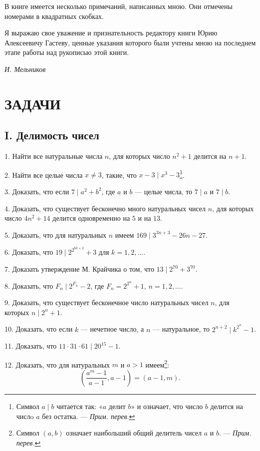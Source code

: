 \documentclass[12pt, a4paper, openany]{book}
\begin{document}
В книге имеется несколько примечаний, написанных мною. Они отмечены номерами в квадратных скобках.

Я выражаю свое уважение и признательность редактору книги Юрию Алексеевичу Гастеву, ценные указания которого были учтены мною на последнем этапе работы над рукописью этой книги.

	\begin{flushright}
	\textit{И. Мельников}
\end{flushright}
\newpage

	\section[Задачи]{\center ЗАДАЧИ}
	\subsection[I. Делимость чисел (1-43)]{\center I. Делимость чисел}

 
1. Найти все натуральные числа $n$, для которых число $n^2+1$ делится на $n+1$.

2. Найти все целые числа $x \neq 3$, такие, что $x - 3 \mid x^3 - 3${\footnote{Символ $a \mid b$ читается так: «$a$ делит $b$» и означает, что число $b$ делится на числo $a$ без остатка. — \textit{Прим. перев}.}}.

3. Доказать, что если $7 \mid a^2 + b^2$, где $a$ и $b$ — целые числа, то $7 \mid a$ и $7 \mid b$.

4. Доказать, что существует бесконечно много натуральных чисел $n$, для которых число $4n^2+14$ делится одновременно на $5$ и на $13$.

5.  Доказать, что для натуральных $n$ имеем $169 \mid 3^{3n+3} - 26n - 27$.

6. Доказать, что $19 \mid 2^{2^{6k+2}} + 3$ для $k=1, 2, \ldots$.

7. Доказать утверждение М. Крайчика о том, что $13 \mid 2^{70}+3^{70}$.

8. Доказать, что $F_n \mid 2^{F_n} - 2$, где $F_n=2^{2^n}+1$, $n=1, 2, \ldots$.

9. Доказать, что существует бесконечное число натуральных чисел $n$, для которых $n \mid 2^n+1$.

10. Доказать, что если $k$ — нечетное число, а $n$ — натуральное, то $2^{n+2} \mid k^{2^{n}}-1$.

11.  Доказать, что $11\cdot31\cdot61 \mid 20^{15}-1$.

12. Доказать, что для натуральных $m$ и $a>1$ имеем{\footnote{Символ $(a, b)$ означает наибольший общий делитель чисел $a$ и $b$. — \textit{Прим. перев.}}}:
$$
\left( \frac{a^m - 1}{a-1}, a-1 \right) = (a-1, m).
$$
\end{document}
